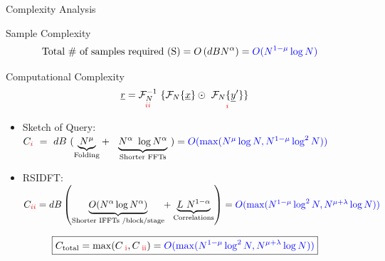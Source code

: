 \documentclass[10pt,xcolor=table]{beamer}
\newcommand{\xv}{\underline{x}}
\newcommand{\yv}{\underline{y}}
\newcommand{\rv}{\underline{r}}
\newcommand{\RNum}[1]{\uppercase\expandafter{\romannumeral #1\relax}}
\begin{document}
\begin{frame}{Complexity Analysis}
	\begin{block}{Sample Complexity}
		\vspace{-10pt}
		\begin{align*}
		\text{Total \# of samples required (S)} &= O \left(dBN^{\alpha}\right) =   {\color{blue}O(N^{1-\mu}\log N)}
		\end{align*}
	\end{block}
\pause
	\begin{block}{Computational Complexity}
		\begin{equation*}\label{eqn:Rxy_fourier}
		\rv = \underset{\color{red}  \RNum{2} } {\mathcal{F}_{N}^{-1}} \ \{   \mathcal{F}_{N}\{\xv\}  \odot \ \underset{\color{red}  \RNum{1}  }{ \mathcal{F}_{N}\{\yv'\}}  \}
		\end{equation*}
		\vspace{-10pt}
\pause
	\begin{itemize}
		\item {\color{blue}Sketch of Query:}\\ \vspace{5pt}
	 {\small $C_{\color{red}\RNum{1}} \ = \  dB ~
	 ( \underset{\text{Folding} }{\underbrace{N^{\mu}}} + \ \
	 \underset{\text{Shorter FFTs} }{\underbrace{N^{\alpha} \ \log N^{\alpha}}} \ )
	 =  {\color{blue} O(\max(N^{\mu}\log N,N^{1-\mu}\log^2 N)) }$}
\pause
		\item {\color{blue}RSIDFT:} \\	{\small$C_{\color{red} \RNum{2}} =  {d B}  \left (
			\underset{\text{Shorter IFFTs /block/stage} }{\underbrace{ O(N^{\alpha}  \log N^{\alpha})}} \hspace{-3pt}+ \underset{\text{Correlations} }{\underbrace{ L~N^{1-\alpha}}} \right ) = {\color{blue} O(\max(N^{1-\mu}\log^2 N ,N^{\mu+\lambda}\log N)) }$}
	\end{itemize}
	\vspace{10pt}	
	\[\boxed{C_{\text{total}} = \max(C_{\color{red} \text{ \RNum{1}}},C_{\color{red} \text{ \RNum{2}}}) = {\color{blue} O(\max(N^{1-\mu}\log^2 N ,N^{\mu+\lambda}\log N)) }}\]
		
	\end{block}
\end{frame}
\end{document}
